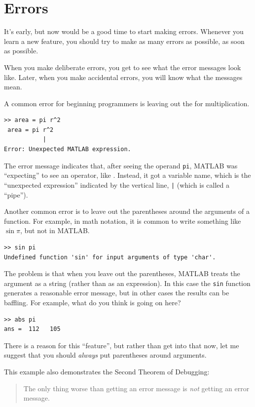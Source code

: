 \documentclass{book}
\begin{document}
\section{Errors}

It's early, but now would be a good time to start making errors.
Whenever you learn a new feature, you should try
to make as many errors as possible, as soon as possible.

When you make deliberate errors, you get to see what the error messages
look like.  Later, when you make accidental errors, you will know what
the messages mean.

A common error for beginning programmers is leaving out the {\tt *}
for multiplication.

\begin{verbatim}
>> area = pi r^2
 area = pi r^2
           | 
Error: Unexpected MATLAB expression.
\end{verbatim}

The error message indicates that, after seeing the operand {\tt pi},
MATLAB was ``expecting'' to see an operator, like {\tt *}.  Instead,
it got a variable name, which is the ``unexpected expression'' indicated
by the vertical line, {\tt |} (which is called a ``pipe'').

Another common error is to leave out the parentheses around the
arguments of a function.  For example, in math notation, it is common
to write something like $\sin \pi$, but not in MATLAB.

\begin{verbatim}
>> sin pi
Undefined function 'sin' for input arguments of type 'char'.
\end{verbatim}

The problem is that when you leave out the parentheses, MATLAB treats
the argument as a string (rather than as an expression).  In
this case the {\tt sin} function generates a reasonable error message,
but in other cases the results can be baffling.  For example, what
do you think is going on here?

\begin{verbatim}
>> abs pi
ans =  112   105
\end{verbatim}

There is a reason for this ``feature'', but rather than get into that
now, let me suggest that you should {\em always} put parentheses around
arguments.

This example also demonstrates the Second Theorem of Debugging:

\begin{quote}
The only thing worse than getting an error message is {\em not}
getting an error message.
\end{quote}
\end{document}
